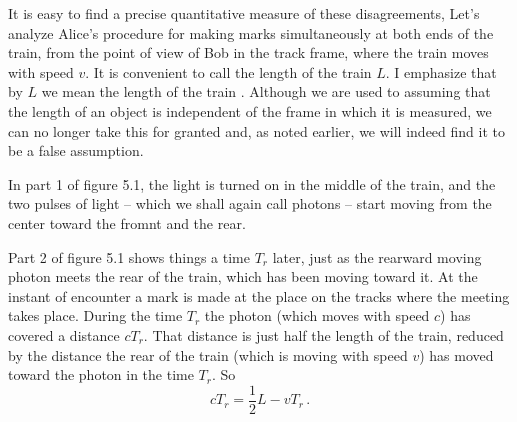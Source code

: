 It is easy to find a precise quantitative measure of these disagreements, Let's analyze Alice's procedure for making marks simultaneously at both ends of the train, from the point of view of Bob in the track frame, where the train moves with speed $v$. It is convenient to call the length of the train $L$. I emphasize that by $L$ we mean the length of the train . Although we are used to assuming that the length of an object is independent of the frame in which it is measured, we can no longer take this for granted and, as noted earlier, we will indeed find it to be a false assumption. 

In part 1 of figure 5.1, the light is turned on in the middle of the train, and the two pulses of light -- which we shall again call photons -- start moving from the center toward the fromnt and the rear. 

Part 2 of figure 5.1 shows things a time $T_r$ later, just as the rearward moving photon meets the rear of the train, which has been moving toward it. At the instant of encounter a mark is made at the place on the tracks where the meeting takes place. During the time $T_r$ the photon (which moves with speed $c$) has covered a distance $cT_r$. That distance is just half the length of the train, reduced by the distance the rear of the train (which is moving with speed $v$) has moved toward the photon in the time $T_r$. So
\begin{equation}\label{eq:Morin_05.1}
c T_r = \frac{1}{2} L - v T_r \,.
\end{equation}

 

